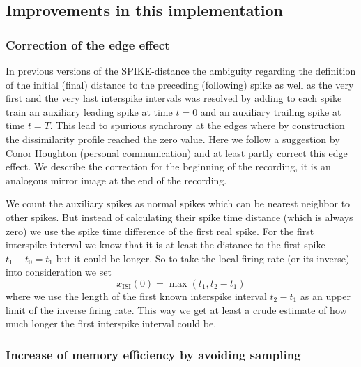 \documentclass[10pt,twocolumn]{elsart5p}
\begin{document}
\subsection{\label{ss:Improvements} Improvements in this implementation}

\subsubsection{\label{sss:Edge-effect} Correction of the edge effect}

In previous versions of the SPIKE-distance the ambiguity regarding the definition of the initial (final) distance to the preceding (following) spike as well as the very first and the very last interspike intervals was resolved by adding to each spike train an auxiliary leading spike at time $t = 0$ and an auxiliary trailing spike at time $t = T$. This lead to spurious synchrony at the edges where by construction the dissimilarity profile reached the zero value. Here we follow a suggestion by Conor Houghton (personal communication) and at least partly correct this edge effect. We describe the correction for the beginning of the recording, it is an analogous mirror image at the end of the recording.

We count the auxiliary spikes as normal spikes which can be nearest neighbor to other spikes. But instead of calculating their spike time distance (which is always zero) we use the spike time difference of the first real spike. For the first interspike interval we know that it is at least the distance to the first spike $t_1-t_0 = t_1$ but it could be longer. So to take the local firing rate (or its inverse) into consideration we set
%
\begin{equation} \label{eq:Corrected-First-ISI}
    x_{\mathrm {ISI}} (0) = \max ( t_1, t_2 - t_1 )	
\end{equation}
%
where we use the length of the first known interspike interval $t_2-t_1$ as an upper limit of the inverse firing rate. This way we get at least a crude estimate of how much longer the first interspike interval could be.


\subsubsection{\label{sss:Sampling} Increase of memory efficiency by avoiding sampling}
\end{document}
